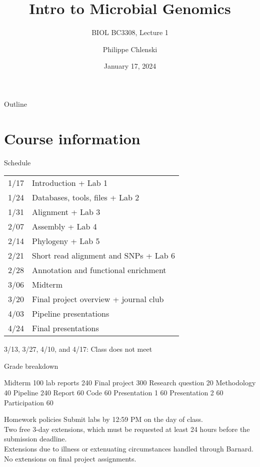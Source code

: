\documentclass{beamer}
\title{Intro to Microbial Genomics}
\subtitle{BIOL BC3308, Lecture 1}
\author{Philippe Chlenski}
\date{January 17, 2024}
\begin{document}
\begin{frame}[plain]
\titlepage
\end{frame}

\begin{frame}{Outline}
\tableofcontents
\end{frame}

\section{Course information}

\begin{frame}{Schedule}
\begin{table}
\centering
\begin{tabular}{l l}
    1/17  & Introduction + Lab 1\\
    1/24  & Databases, tools, files + Lab 2\\
    1/31  & Alignment + Lab 3\\
    2/07  & Assembly + Lab 4\\
    2/14  & Phylogeny + Lab 5\\
    2/21  & Short read alignment and SNPs + Lab 6\\
    2/28  & Annotation and functional enrichment\\
    3/06  & Midterm\\
    3/20  & Final project overview + journal club\\
    4/03  & Pipeline presentations\\
    4/24  & Final presentations
\end{tabular}
\end{table}
3/13, 3/27, 4/10, and 4/17: Class does not meet
\end{frame}

\begin{frame}{Grade breakdown}
    \begin{outline}
        \1[] Midterm \hfill 100
         lab reports \hfill 240 
        \1[] Final project \hfill 300 
        \hline
            \2[] Research question \hfill 20 
            \2[] Methodology \hfill 40 
            \2[] Pipeline \hfill 240 
            \hline
                \3[] Report \hfill 60
                \3[] Code \hfill 60 
                \3[] Presentation 1 \hfill 60
                \3[] Presentation 2 \hfill 60
        \1[] Participation \hfill 60
    \end{outline}
\end{frame}

\begin{frame}{Homework policies}
Submit labs by 12:59 PM on the day of class.\\
\bigskip
Two free 3-day extensions, which must be requested at least 24 hours before the submission deadline.\\
\bigskip
Extensions due to illness or extenuating circumstances handled through Barnard.\\
\bigskip
No extensions on final project assignments.
\end{frame}
\end{document}
